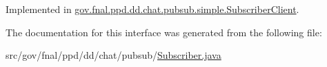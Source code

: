 Implemented in \hyperlink{classgov_1_1fnal_1_1ppd_1_1dd_1_1chat_1_1pubsub_1_1simple_1_1SubscriberClient_a0f67ce21161ccc7cf6248af772ffc494}{gov.\-fnal.\-ppd.\-dd.\-chat.\-pubsub.\-simple.\-Subscriber\-Client}.



The documentation for this interface was generated from the following file\-:\begin{DoxyCompactItemize}
\item 
src/gov/fnal/ppd/dd/chat/pubsub/\hyperlink{Subscriber_8java}{Subscriber.\-java}\end{DoxyCompactItemize}
